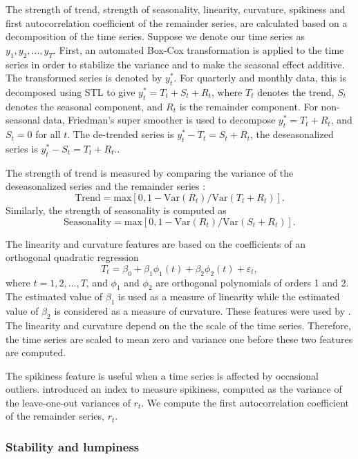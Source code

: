 \documentclass[11pt,a4paper,]{article}
\def\var{\text{Var}}
\begin{document}
The strength of trend, strength of seasonality, linearity, curvature, spikiness and first autocorrelation coefficient of the remainder series, are calculated based on a decomposition of the time series. Suppose we denote our time series as \(y_1, y_2, \dots,y_T\). First, an automated Box-Cox transformation \autocite{Guerrero1993} is applied to the time series in order to stabilize the variance and to make the seasonal effect additive. The transformed series is denoted by \(y_{t}^*\). For quarterly and monthly data, this is decomposed using STL \autocite{cleveland1990stl} to give \(y_t^*=T_t+S_t+R_t\), where \(T_t\) denotes the trend, \(S_t\) denotes the seasonal component, and \(R_t\) is the remainder component. For non-seasonal data, Friedman's super smoother \autocite{supsmu} is used to decompose \(y_t^*=T_t+R_t\), and \(S_t=0\) for all \(t\). The de-trended series is \(y_t^*-T_t=S_t+R_t\), the deseasonalized series is \(y_t^*-S_t = T_t+R_t\)..

The strength of trend is measured by comparing the variance of the deseasonalized series and the remainder series \autocite{wang2009rule}:
\[
    \text{Trend} = \text{max}\left[0, 1 - \var(R_{t})/\var(T_t+R_t)\right].
\]
Similarly, the strength of seasonality is computed as
\[
    \text{Seasonality} = \text{max}\left[0, 1- \var(R_{t})/ \var(S_t+R_t)\right].
\]

The linearity and curvature features are based on the coefficients of an orthogonal quadratic regression
\[
  T_t=\beta_0+\beta_1 \phi_1(t) + \beta_2\phi_2(t) + \varepsilon_t,
\]
where \(t=1, 2, \dots,T\), and \(\phi_1\) and \(\phi_2\) are orthogonal polynomials of orders 1 and 2. The estimated value of \(\beta_1\) is used as a measure of linearity while the estimated value of \(\beta_2\) is considered as a measure of curvature. These features were used by \textcite{hyndman2015large}. The linearity and curvature depend on the the scale of the time series. Therefore, the time series are scaled to mean zero and variance one before these two features are computed.

The spikiness feature is useful when a time series is affected by occasional outliers. \textcite{hyndman2015large} introduced an index to measure spikiness, computed as the variance of the leave-one-out variances of \(r_t\). We compute the first autocorrelation coefficient of the remainder series, \(r_t\).

\hypertarget{stability-and-lumpiness}{%
\subsubsection*{Stability and lumpiness}\label{stability-and-lumpiness}}
\end{document}
